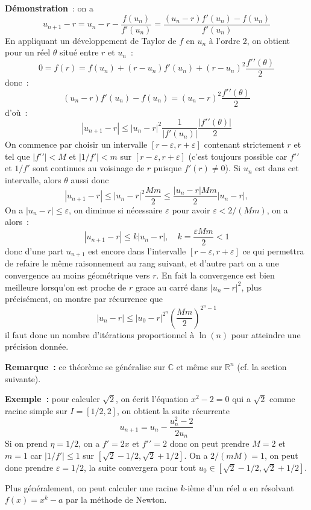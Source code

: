 \documentclass[a4paper,11pt]{article}
\newcommand{\R}{{\mathbb{R}}}
\newcommand{\C}{{\mathbb{C}}}
\begin{document}
\begin{giacjshere}
{\bf Démonstration}~: on a
\[ u_{n+1}-r = u_n - r - \frac{f(u_n)}{f'(u_n)} = 
\frac{(u_n-r)f'(u_n)-f(u_n)}{f'(u_n)} \]
En appliquant un développement de Taylor de $f$ en $u_n$ à l'ordre 2,
on obtient pour un réel $\theta$
situé entre $r$ et $u_n$~:
\[ 0 = f(r)=f(u_n)+(r-u_n) f'(u_n) + (r-u_n)^2 \frac{f'{'}(\theta)}{2} \]
donc~:
\[ (u_n-r)f'(u_n)-f(u_n)= (u_n-r)^2 \frac{f'{'}(\theta)}{2} \]
d'o\`u~:
\[ |u_{n+1}-r| \leq |u_n-r|^2 \frac{1}{|f'(u_n)|} 
\frac{|f'{'}(\theta)|}{2} \]
On commence par choisir un intervalle $[r-\varepsilon,r+\varepsilon]$
contenant strictement $r$ et tel que $|f'{'}|<M$ et $|1/f'|<m$
sur $[r-\varepsilon,r+\varepsilon]$ (c'est toujours possible car
$f'{'}$ et $1/f'$ sont continues au voisinage de $r$ puisque $f'(r)\neq 0$).
Si $u_n$ est dans cet intervalle, alors $\theta$ aussi donc
\begin{equation}\label{eq:newton}
 |u_{n+1}-r| \leq |u_n-r|^2 \frac{Mm}{2} \leq  \frac{|u_n-r|Mm}{2}
|u_n-r|,  
\end{equation}
On a $|u_n-r| \leq \varepsilon$, on diminue si n\'ecessaire
$\varepsilon$ pour avoir $\varepsilon < 2/(Mm)$, on a alors~:
\[ |u_{n+1}-r| \leq k |u_n-r|, \quad k=\frac{\varepsilon Mm}{2}<1  \]
donc d'une part $u_{n+1}$ est encore dans l'intervalle 
$[r-\varepsilon,r+\varepsilon]$ 
ce qui permettra de refaire le m\^eme raisonnement au rang
suivant, et d'autre part
on a une convergence au moins géométrique vers $r$.
En fait la convergence est bien meilleure
lorsqu'on est proche de $r$ grace au carré dans $|u_n-r|^2$,
plus pr\'ecis\'ement, on montre par r\'ecurrence que
\[ |u_n-r| \leq |u_0 - r|^{2^n} \left( \frac{Mm}{2} \right)^{2^n-1}
\]
il faut donc un nombre d'it\'erations proportionnel \`a $\ln(n)$
pour atteindre une pr\'ecision donn\'ee.

{\bf Remarque~:} ce théorème se généralise sur $\C$ et même sur $\R^n$
(cf. la section suivante).

{\bf Exemple~:} pour calculer $\sqrt{2}$, on écrit l'équation $x^2-2=0$
qui a $\sqrt{2}$ comme racine simple sur $I=[1/2,2]$, 
on obtient la suite récurrente
\[ u_{n+1} = u_n - \frac{u_n^2-2}{2u_n} \]
Si on prend $\eta=1/2$, on a $f'=2x$ et $f'{'}=2$
donc on peut prendre $M=2$ et $m=1$ car $|1/f'|\leq 1$ sur 
$[\sqrt{2}-1/2,\sqrt{2}+1/2]$. On a $2/(mM)=1$, on peut donc 
prendre $\varepsilon=1/2$, la suite convergera pour tout 
$ u_0 \in [\sqrt{2}-1/2,\sqrt{2}+1/2]$.

Plus généralement, on peut calculer une racine $k$-ième d'un réel $a$
en résolvant $f(x)=x^k-a$ par la méthode de Newton.


\end{giacjshere}
\end{document}
